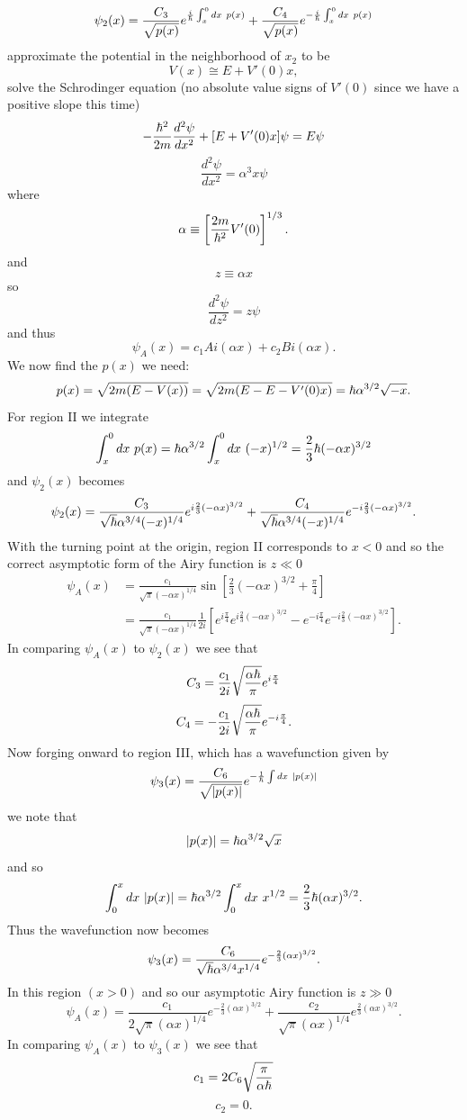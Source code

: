 \documentclass[11pt,letterpaper]{article}
\begin{document}
\begin{enumerate}
\begin{enumerate}
 $$\psi_2(x) = \frac{C_3}{\sqrt{p(x)}}e^{\frac{i}{\hbar}\int^{0}_x{dx\  p(x)}}+\frac{C_4}{\sqrt{p(x)}}e^{-\frac{i}{\hbar}\int_{x}^{0}{dx\  p(x)}}$$
 approximate the potential in the neighborhood of $x_2$ to be
 $$V(x) \cong  E+V'(0)x,$$
 solve the Schrodinger equation (no absolute value signs of $V'(0)$ since we have a positive slope this time)
 $$-\frac{\hbar^2}{2m}\frac{d^2\psi}{dx^2}+[E+V'(0)x]\psi = E\psi$$
$$\frac{d^2\psi}{dx^2} = \alpha^3x\psi$$
where
$$\alpha \equiv \left[\frac{2m}{\hbar^2}V'(0)\right]^{1/3}.$$
and
$$z\equiv \alpha x$$
so
$$\frac{d^2\psi}{dz^2} = z\psi$$
and thus
$$\psi_A(x) = c_1Ai(\alpha x)+c_2Bi(\alpha x).$$
We now find the $p(x)$ we need:
$$p(x) = \sqrt{2m(E-V(x))} = \sqrt{2m(E-E-V'(0)x)} = \hbar\alpha^{3/2}\sqrt{-x}.$$
For region II we integrate
$$\int_x^{0}{dx\ p(x)} = \hbar\alpha^{3/2}\int_x^{0}{dx\ (-x)^{1/2}} = \frac{2}{3}\hbar(-\alpha x)^{3/2}$$
and $\psi_2(x)$ becomes
 $$\psi_{2}(x) = \frac{C_3}{\sqrt{\hbar}\alpha^{3/4}(-x)^{1/4}}e^{i\frac{2}{3}(-\alpha x)^{3/2}}+\frac{C_4}{\sqrt{\hbar}\alpha^{3/4}(-x)^{1/4}}e^{-i\frac{2}{3}(-\alpha x)^{3/2}}.$$
With the turning point at the origin, region II corresponds to $x<0$ and so the correct asymptotic form of the Airy function is $z\ll 0$
 \begin{align*}\psi_A(x) &= \frac{c_1}{\sqrt\pi(-\alpha x)^{1/4}}\sin\left[\frac{2}{3}(-\alpha x)^{3/2}+\frac{\pi}{4}\right]\\
 &=\frac{c_1}{\sqrt\pi(-\alpha x)^{1/4}}\frac{1}{2i}\left[e^{i\frac{\pi}{4}}e^{i\frac{2}{3}(-\alpha x)^{3/2}}-e^{-i\frac{\pi}{4}}e^{-i\frac{2}{3}(-\alpha x)^{3/2}}\right].
 \end{align*}
 In comparing $\psi_A(x)$ to $\psi_2(x)$
 we see that 
 $$C_3 = \frac{c_1}{2i}\sqrt{\frac{\alpha\hbar}{\pi}}e^{i\frac{\pi}{4}}$$
 $$C_4 = -\frac{c_1}{2i}\sqrt{\frac{\alpha\hbar}{\pi}}e^{-i\frac{\pi}{4}}.$$
 Now forging onward to region III, which has a wavefunction given by
 $$\psi_3(x) =  \frac{C_6}{\sqrt{|p(x)|}}e^{-\frac{1}{\hbar}\int{dx\  |p(x)|}}$$
 we note that
 $$|p(x)| = \hbar\alpha^{3/2}\sqrt{x}$$
 and so 
 $$\int_0^{x}{dx\ |p(x)|} = \hbar\alpha^{3/2}\int_0^{x}{dx\ x^{1/2}} = \frac{2}{3}\hbar(\alpha x)^{3/2}.$$
 Thus the wavefunction now becomes
$$\psi_3(x) = \frac{C_6}{\sqrt{\hbar}\alpha^{3/4}x^{1/4}}e^{-\frac{2}{3}(\alpha x)^{3/2}}.$$
In this region $(x>0)$ and so our asymptotic Airy function is $z\gg 0$
$$\psi_A(x) = \frac{c_1}{2\sqrt\pi (\alpha x)^{1/4}}e^{-\frac{2}{3}(\alpha x)^{3/2}}+\frac{c_2}{\sqrt\pi (\alpha x)^{1/4}}e^{\frac{2}{3}(\alpha x)^{3/2}}.$$
 In comparing $\psi_A(x)$ to $\psi_3(x)$ we see that
$$c_1 = 2C_6\sqrt{\frac{\pi}{\alpha\hbar}}$$
   $$c_2 = 0.$$ 

\end{enumerate}
\end{enumerate}
\end{document}
